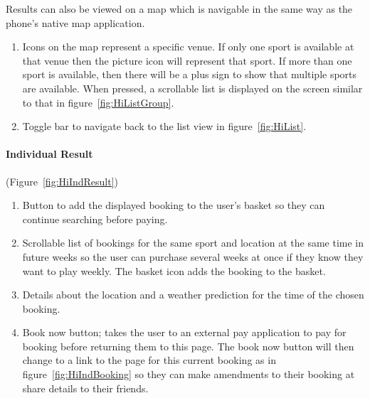 Results can also be viewed on a map which is navigable in the same
way as the phone's native map application.
\begin{enumerate}
	\item Icons on the map represent a specific venue. If only one sport is
		available at that venue then the picture icon will represent that
		sport. If more than one sport is available, then there will be a plus
		sign to show that multiple sports are available. When pressed, a
		scrollable list is displayed on the screen similar to that in
		figure~\ref{fig:HiListGroup}.
	\item Toggle bar to navigate back to the list view in
		figure~\ref{fig:HiList}.
\end{enumerate}

\paragraph{Individual Result} (Figure~\ref{fig:HiIndResult})

\begin{enumerate}
	\item Button to add the displayed booking to the user's basket so they can
		continue searching before paying.
	\item Scrollable list of bookings for the same sport and location at the
		same time in future weeks so the user can purchase several weeks at
		once if they know they want to play weekly. The basket icon adds the
		booking to the basket.
	\item Details about the location and a weather prediction for the time of
		the chosen booking.
	\item Book now button; takes the user to an external pay application to pay
		for booking before returning them to this page. The book now button
		will then change to a link to the page for this current booking as in
		figure~\ref{fig:HiIndBooking} so they can make amendments to their
		booking at share details to their friends.
\end{enumerate}
